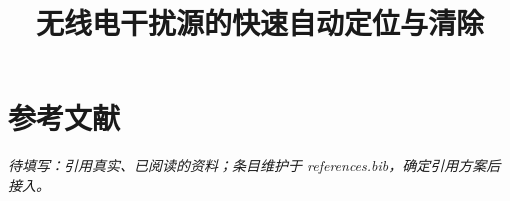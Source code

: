 \documentclass[UTF8,a4paper,zihao=-4,fontset=fandol]{ctexart}
\title{无线电干扰源的快速自动定位与清除}
\author{}
\date{}
\newcommand{\pending}[1]{\par\noindent\textit{待填写：#1}\par}
\begin{document}
\pagestyle{plain}
\maketitle

\clearpage






\clearpage


\section{参考文献}
\pending{引用真实、已阅读的资料；条目维护于 references.bib，确定引用方案后接入。}
\appendix

\end{document}
